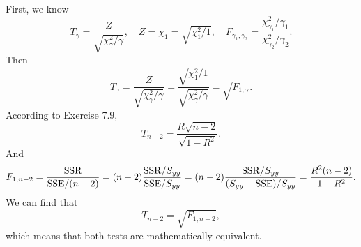 \documentclass[11pt,a4paper]{article}
\author{Group 37}
\subtitle{Assignment}
\begin{document}
\maketitle

\subsection{}
First, we know
$$T_\gamma=\frac{Z}{\sqrt{\chi^2_\gamma/\gamma}},\quad Z=\chi_1=\sqrt{\chi^2_1/1},\quad F_{\gamma_1,\gamma_2}=\frac{\chi^2_{\gamma_1}/\gamma_1}{\chi^2_{\gamma_2}/\gamma_2}.$$
Then
$$T_\gamma=\frac{Z}{\sqrt{\chi^2_\gamma/\gamma}}=\frac{\sqrt{\chi^2_1/1}}{\sqrt{\chi^2_\gamma/\gamma}}=\sqrt{F_{1,\gamma}}.$$
According to Exercise 7.9,
$$T_{n-2}=\frac{R\sqrt{n-2}}{\sqrt{1-R^2}}.$$
And
$$F_{1,n-2}=\frac{\rm SSR}{{\rm SSE}/(n-2)}=(n-2)\frac{{\rm SSR}/S_{yy}}{{\rm SSE}/S_{yy}}=(n-2)\frac{{\rm SSR}/S_{yy}}{(S_{yy}-{\rm SSE})/S_{yy}}=\frac{R^2(n-2)}{1-R^2}.$$
We can find that $$T_{n-2}=\sqrt{F_{1,n-2}},$$
which means that both tests are mathematically equivalent.
\end{document}
